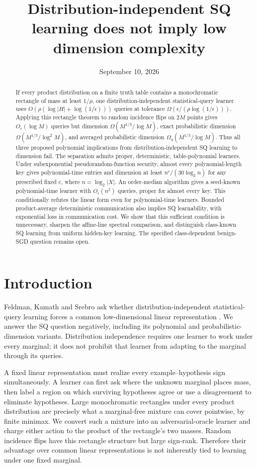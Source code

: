 \documentclass[11pt]{article}
\title{Distribution-independent SQ learning does not imply low dimension complexity}
\author{}
\date{September 10, 2026}
\newcommand{\1}{\mathbf 1}
\begin{document}
\maketitle
\begin{abstract}
If every product distribution on a finite truth table contains a monochromatic rectangle of mass at least $1/\rho$, one distribution-independent statistical-query learner uses $O(\rho(\log|H|+\log(1/\epsilon)))$ queries at tolerance $\Omega(\epsilon/(\rho\log(1/\epsilon)))$. Applying this rectangle theorem to random incidence flips on $2M$ points gives $O_\epsilon(\log M)$ queries but dimension $\Omega(M^{1/3}/\log M)$, exact probabilistic dimension $\Omega(M^{1/3}/\log^2M)$, and averaged probabilistic dimension $\Omega_\eta(M^{1/3}/\log M)$. Thus all three proposed polynomial implications from distribution-independent SQ learning to dimension fail. The separation admits proper, deterministic, table-polynomial learners. Under subexponential pseudorandom-function security, almost every polynomial-length key gives polynomial-time entries and dimension at least $n^c/(30\log_2n)$ for any prescribed fixed $c$, where $n=\log_2|X|$. An order-median algorithm gives a seed-known polynomial-time learner with $O_\epsilon(n^2)$ queries, proper for almost every key. This conditionally refutes the linear form even for polynomial-time learners. Bounded product-average deterministic communication also implies SQ learnability, with exponential loss in communication cost. We show that this sufficient condition is unnecessary, sharpen the affine-line spectral comparison, and distinguish class-known SQ learning from uniform hidden-key learning. The specified class-dependent benign-SGD question remains open.
\end{abstract}

\section{Introduction}
Feldman, Kamath and Srebro ask whether distribution-independent statistical-query learning forces a common low-dimensional linear representation \citep{FKS26}. We answer the SQ question negatively, including its polynomial and probabilistic-dimension variants. Distribution independence requires one learner to work under every marginal; it does not prohibit that learner from adapting to the marginal through its queries.

A fixed linear representation must realize every example--hypothesis sign simultaneously. A learner can first ask where the unknown marginal places mass, then label a region on which surviving hypotheses agree or use a disagreement to eliminate hypotheses. Large monochromatic rectangles under every product distribution are precisely what a marginal-free mixture can cover pointwise, by finite minimax. We convert such a mixture into an adversarial-oracle learner and charge either action to the product of the rectangle's two masses. Random incidence flips have this rectangle structure but large sign-rank. Therefore their advantage over common linear representations is not inherently tied to learning under one fixed marginal.
\end{document}
